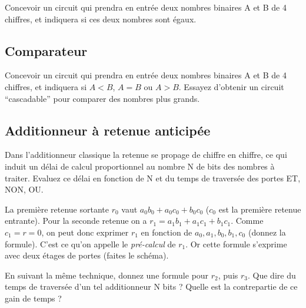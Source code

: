Concevoir un circuit qui prendra en entr\'ee deux nombres binaires A et B 
de 4 chiffres, et indiquera si ces deux nombres sont \'egaux.

\subsection{Comparateur}
Concevoir un circuit qui prendra en entr\'ee deux nombres binaires A
et B de 4 chiffres, et indiquera si $A<B$, $A=B$ ou $A>B$.  Essayez
d'obtenir un circuit ``cascadable'' pour comparer des nombres plus
grands.


\subsection{Additionneur \`a retenue anticip\'ee}

Dans l'additionneur classique la retenue se propage de chiffre
en chiffre, ce qui induit un d\'elai de calcul proportionnel au
nombre N de bits des nombres \`a traiter.  Evaluez ce délai
en fonction de N et du temps de travers\'ee des portes ET, NON, OU.

La premi\`ere retenue sortante $r_0$ vaut $a_0b_0 + a_0c_0 + b_0c_0$
($c_0$ est la premi\`ere retenue entrante). Pour la seconde retenue
on a $r_1 = a_1b_1 + a_1c_1 + b_1c_1$. Comme $c_1=r=0$, on peut donc
exprimer $r_1$ en fonction de $a_0,a_1,b_0,b_1,c_0$ (donnez la formule).
C'est ce qu'on appelle le {\em pr\'e-calcul} de $r_1$.
Or cette formule s'exprime avec deux \'etages de portes
(faites le sch\'ema). 

En suivant la m\^eme technique, donnez une formule pour $r_2$, puis
$r_3$. Que dire du temps de travers\'ee d'un tel additionneur N bits ?
Quelle est la contrepartie de ce gain de temps ?

 
